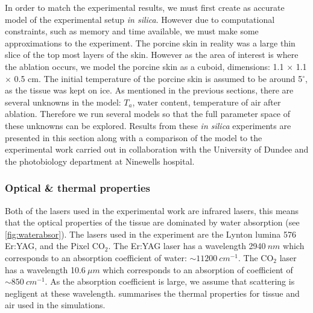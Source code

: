 In order to match the experimental results, we must first create as accurate model of the experimental setup \textit{in silica}. However due to computational constraints, such as memory and time available, we must make some approximations to the experiment. The porcine skin in reality was a large thin slice of the top most layers of the skin. However as the area of interest is where the ablation occurs, we model the porcine skin as a cuboid, dimensions: 1.1 $\times$ 1.1 $\times$ 0.5 cm. The initial temperature of the porcine skin is assumed to be around 5$^{\circ}$, as the tissue was kept on ice. 
As mentioned in the previous sections, there are several unknowns in the model: $T_a$, water content, temperature of air after ablation. Therefore we run several models so that the full parameter space of these unknowns can be explored.
Results from these \textit{in silica} experiments are presented in this section along with a comparison of the model to the experimental work carried out in collaboration with the University of Dundee and the photobiology department at Ninewells hospital.


\subsubsection{Optical \& thermal properties}

Both of the lasers used in the experimental work are infrared lasers, this means that the optical properties of the tissue are dominated by water absorption (see \cref{fig:waterabsor}). The lasers used in the experiment are the Lynton lumina 576 Er:YAG, and the Pixel CO$_2$. The Er:YAG laser has a wavelength 2940$~nm$ which corresponds to an absorption coefficient of water: $\sim 11200~cm^{-1}$. The CO$_2$ laser has a wavelength 10.6$~\mu m$ which corresponds to an absorption of coefficient of $\sim 850~cm^{-1}$. As the absorption coefficient is large, we assume that scattering is negligent at these wavelength.
 summarises the thermal properties for tissue and air used in the simulations.  

